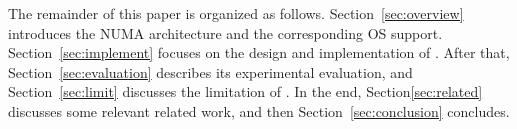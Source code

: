 The remainder of this paper is organized as follows. Section~\ref{sec:overview} introduces the NUMA architecture and the corresponding OS support. Section~\ref{sec:implement} focuses on the design and implementation of \NM{}. After that, Section~\ref{sec:evaluation} describes its experimental evaluation, and Section~\ref{sec:limit} discusses the limitation of \NM{}. In the end, Section\ref{sec:related} discusses some relevant related work, and then Section~\ref{sec:conclusion} concludes. 

\begin{comment}

eve have evaluated it on a range of benchmarks and real applications on two different NUMA architecture. The evaluation showed that \NA{} could significant improve the performance by up to 2X, with the average of 10\% performance. The evaluation also show that \NA{} has a bigger performance improvement on  


 
How to design the new allocator? This is the new one. 

We will try to achieve the following target. 

(1) The performance will be as efficient as possible. 
(2) It is still 
For information-computable, we will achieve the following targets:
We should still use the address to infer the following information, such as the size of the object and the shadow memory placement.

We don't support many bags for the same size class, just one big bag for each size class of each heap. Why it is necessary? 

We would like to reduce the memory blowup as much as possible, where the memory will be returned back to the current thread's heap. 

In order to support that, maybe we could have a big heap for the same size class, but different threads will start from different placement. 

Is it good for the NUMA support in the future? For NUMA support, it is great if we can always return the memory back to its original 


Virtual address will be divided into multiple nodes. 

Then inside each step, we will divide a sub-heap into multiple mini-heaps, where each mini-heap will support one thread. 


Virtual address will be divided into multiple nodes. 

Then inside each per-node heap, we will further divide it into multiple mini-heaps, where each mini-heap will support one thread in order to reduce the possible contention. 


\end{comment}

